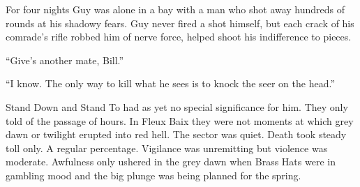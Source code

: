 For four nights Guy was alone in a bay with a man who shot away hundreds of rounds at his shadowy fears. Guy never fired a shot himself, but each crack of his comrade's rifle robbed him of nerve force, helped shoot his indifference to pieces.

``Give's another mate, Bill.''

``I know. The only way to kill what he sees is to knock the seer on the head.''

Stand Down and Stand To had as yet no special significance for him. They only told of the passage of hours. In Fleux Baix they were not moments at which grey dawn or twilight erupted into red hell. The sector was quiet. Death took steady toll only. A regular percentage. Vigilance was unremitting but violence was moderate. Awfulness only ushered in the grey dawn when Brass Hats were in gambling mood and the big plunge was being planned for the spring.
